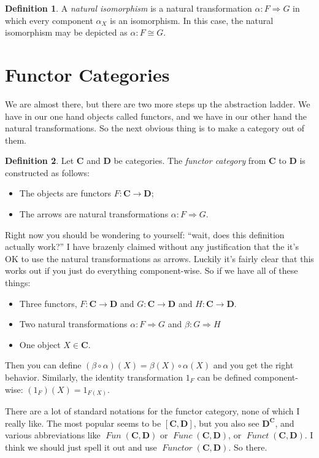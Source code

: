 \documentclass[12pt]{article}
\theoremstyle{definition}
\theoremstyle{definition}
\newtheorem{defn}{Definition}[]
\theoremstyle{definition}
\numberwithin{equation}{section}
\newcommand{\cat}[1]{\mathbf{#1}}      %
\newcommand{\CC}{\cat{C}}
\newcommand{\DD}{\cat{D}}
\DeclareMathOperator{\Fun}{\mathit{Functor}}
\newcommand{\iso}{\cong}                %
\newcommand{\fto}{\Rightarrow}
\def\ni{\goodbreak\noindent}
\begin{document}
\begin{defn}
A {\it natural isomorphism} is a natural transformation $\alpha: F \fto G$ in which every
component $\alpha_X$ is an isomorphism. In this case, the natural isomorphism may be
depicted as $\alpha: F \iso G$.
\end{defn}

\section{Functor Categories}

We are almost there, but there are two more steps up the abstraction ladder. We have in
our one hand objects called functors, and we have in our other hand the natural
transformations. So the next obvious thing is to make a category out of them.

\begin{defn}
 Let $\CC$ and $\DD$ be categories. The \emph{functor category} from $\CC$ to $\DD$ is
 constructed as follows:
 \begin{itemize}
  \item The objects are functors $F: \CC \to \DD$;
  \item The arrows are natural transformations $\alpha:F\fto G$.
 \end{itemize}
\end{defn}
\ni
Right now you should be wondering to yourself: ``wait, does this definition actually
work?'' I have brazenly claimed without any justification that the it's OK to use the
natural transformations as arrows. Luckily it's fairly clear that this works out if you
just do everything component-wise. So if we have all of these things: 
\begin{itemize}
\item Three functors, $F: \CC \to \DD$ and $G: \CC \to \DD$ and $H:\CC \to \DD$.

\item Two natural transformations $\alpha: F \fto G$ and $\beta: G \fto H$

\item One object $X \in \CC$.
\end{itemize}
\ni
Then you can define $(\beta \circ \alpha)(X) = \beta(X) \circ \alpha(X)$ and you get the
right behavior. Similarly, the identity transformation $1_F$ can be defined
component-wise: $(1_F)(X) = 1_{F(X)}$.

There are a lot of standard notations for the functor category,
none of which I really like. The
most popular seems to be $[\CC, \DD]$, but you also see $\DD^{\CC}$, and various  
abbreviations like $\mathop{\mathit{Fun}}(\CC,\DD)$ or $\mathop{\mathit{Func}}(\CC,\DD)$,
or $\mathop{\mathit{Funct}}(\CC,\DD)$. I think we should just spell it out and use
$\Fun(\CC,\DD)$. So there.
\end{document}
